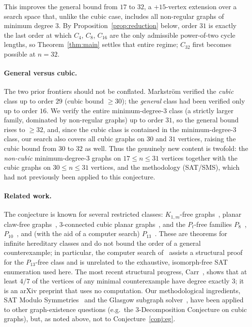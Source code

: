 \documentclass[11pt]{article}
\begin{document}
This improves the general bound from $17$ to $32$, a $+15$-vertex extension over a
search space that, unlike the cubic case, includes all non-regular graphs of
minimum degree $3$. By Proposition~\ref{prop:reduction} below, order $31$ is
exactly the last order at which $C_4$, $C_8$, $C_{16}$ are the only admissible
power-of-two cycle lengths, so Theorem~\ref{thm:main} settles that entire regime;
$C_{32}$ first becomes possible at $n=32$.

\paragraph{General versus cubic.} The two prior frontiers should not be conflated.
Markstr\"om verified the \emph{cubic} class up to order $29$ (cubic bound
$\ge 30$); the \emph{general} class had been verified only up to order $16$. We
verify the entire minimum-degree-3 class (a strictly larger family, dominated by
non-regular graphs) up to order $31$, so the general bound rises to $\ge 32$, and,
since the cubic class is contained in the minimum-degree-3 class, our search also
covers all cubic graphs on $30$ and $31$ vertices, raising the cubic bound from
$30$ to $32$ as well. Thus the genuinely new content is twofold: the
\emph{non-cubic} minimum-degree-3 graphs on $17 \le n \le 31$ vertices together
with the cubic graphs on $30 \le n \le 31$ vertices, and the methodology (SAT/SMS),
which had not previously been applied to this conjecture.

\paragraph{Related work.} The conjecture is known for several restricted classes:
$K_{1,m}$-free graphs~\cite{shauger}, planar claw-free graphs~\cite{daniel-shauger},
3-connected cubic planar graphs~\cite{heckman-krakovski}, and the $P_t$-free
families $P_8$~\cite{gao-shan}, $P_{10}$~\cite{hu-shen}, and (with the aid of a
computer search) $P_{13}$~\cite{hegde2024}. These are theorems for infinite
hereditary classes and do not bound the order of a general counterexample; in
particular, the computer search of~\cite{hegde2024} assists a structural proof for
the $P_{13}$-free class and is unrelated to the exhaustive, isomorph-free
SAT enumeration used here. The
most recent structural progress, Carr~\cite{carr2026}, shows that at least $4/7$ of
the vertices of any minimal counterexample have degree exactly $3$; it is an
arXiv preprint that uses no computation. Our methodological ingredients, SAT
Modulo Symmetries~\cite{sms-tocl,szeider-survey} and the Glasgow subgraph
solver~\cite{glasgow}, have been applied to other graph-existence questions
(e.g.\ the 3-Decomposition Conjecture on cubic graphs), but, as noted above, not
to Conjecture~\ref{conj:eg}.
\end{document}
